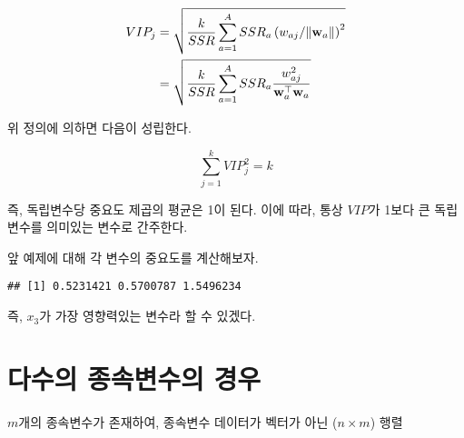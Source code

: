 \documentclass[]{book}
\newenvironment{Shaded}{\begin{snugshade}}{\end{snugshade}}
\newcommand{\DecValTok}[1]{\textcolor[rgb]{0.00,0.00,0.81}{#1}}
\newcommand{\KeywordTok}[1]{\textcolor[rgb]{0.13,0.29,0.53}{\textbf{#1}}}
\newcommand{\NormalTok}[1]{#1}
\newcommand{\OperatorTok}[1]{\textcolor[rgb]{0.81,0.36,0.00}{\textbf{#1}}}
\newcommand{\StringTok}[1]{\textcolor[rgb]{0.31,0.60,0.02}{#1}}
\begin{document}
\begin{equation}
\begin{split}
VIP_j &= \sqrt{\frac{k}{SSR} \sum_{a = 1}^{A} SSR_a \left( w_{aj} \middle/ \| \mathbf{w}_a \|  \right)^2}\\
&= \sqrt{\frac{k}{SSR} \sum_{a = 1}^{A} SSR_a \frac{w_{aj}^2}{\mathbf{w}_a^\top \mathbf{w}_a}}
\end{split} \label{eq:plsr-single-vip}
\end{equation}

위 정의에 의하면 다음이 성립한다.

\[
\sum_{j = 1}^{k} VIP_j^2 = k
\]

즉, 독립변수당 중요도 제곱의 평균은 1이 된다. 이에 따라, 통상 \(VIP\)가 1보다 큰 독립변수를 의미있는 변수로 간주한다.

앞 예제에 대해 각 변수의 중요도를 계산해보자.

\begin{Shaded}
\end{Shaded}

\begin{verbatim}
## [1] 0.5231421 0.5700787 1.5496234
\end{verbatim}

즉, \(x_3\)가 가장 영향력있는 변수라 할 수 있겠다.

\hypertarget{plsr-multivariate-target}{%
\section{다수의 종속변수의 경우}\label{plsr-multivariate-target}}

\(m\)개의 종속변수가 존재하여, 종속변수 데이터가 벡터가 아닌 (\(n \times m\)) 행렬
\end{document}
